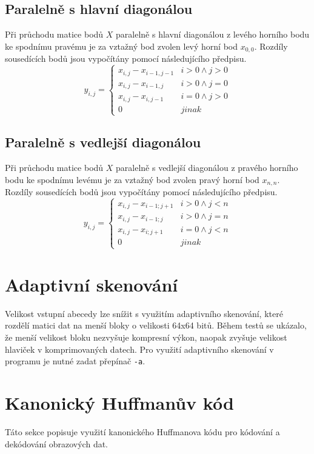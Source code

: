 \documentclass[a4paper, 11pt, fleqn]{scrartcl}
\begin{document}
    \subsection{Paralelně s hlavní diagonálou}
      Při průchodu matice bodů $X$ paralelně s hlavní diagonálou z levého horního bodu ke spodnímu pravému je za vztažný bod zvolen levý horní bod $x_{0,0}$. Rozdíly sousedících bodů jsou vypočítány pomocí následujícího předpisu.
      $$
      y_{i,j} = \begin{cases}
                  x_{i,j} - x_{i-1,j-1}   & i > 0 \land j > 0\\
                  x_{i,j} - x_{i-1,j}     & i > 0 \land j = 0\\
                  x_{i,j} - x_{i,j-1}     & i = 0 \land j > 0\\
                  0                       & jinak
                \end{cases}
      $$

    \subsection{Paralelně s vedlejší diagonálou}
      Při průchodu matice bodů $X$ paralelně s vedlejší diagonálou z pravého horního bodu ke spodnímu levému je za vztažný bod zvolen pravý horní bod $x_{n,n}$. Rozdíly sousedících bodů jsou vypočítány pomocí následujícího předpisu.
      $$
      y_{i,j} = \begin{cases}
                  x_{i,j} - x_{i-1;j+1}   & i > 0 \land j < n\\
                  x_{i,j} - x_{i-1;j}     & i > 0 \land j = n\\
                  x_{i,j} - x_{i;j+1}     & i = 0 \land j < n\\
                  0                       & jinak
                \end{cases}
      $$

    \section{Adaptivní skenování}
      Velikost vstupní abecedy lze snížit s využitím adaptivního skenování, které rozdělí matici dat na menší bloky o velikosti 64x64 bitů. Během testů se ukázalo, že menší velikost bloku nezvyšuje kompresní výkon, naopak zvyšuje velikost hlaviček v komprimovaných datech. Pro využití adaptivního skenování v programu je nutné zadat přepínač \texttt{-a}.

    \section{Kanonický Huffmanův kód}
      Táto sekce popisuje využití kanonického Huffmanova kódu pro kódování a dekódování obrazových dat.
\end{document}
